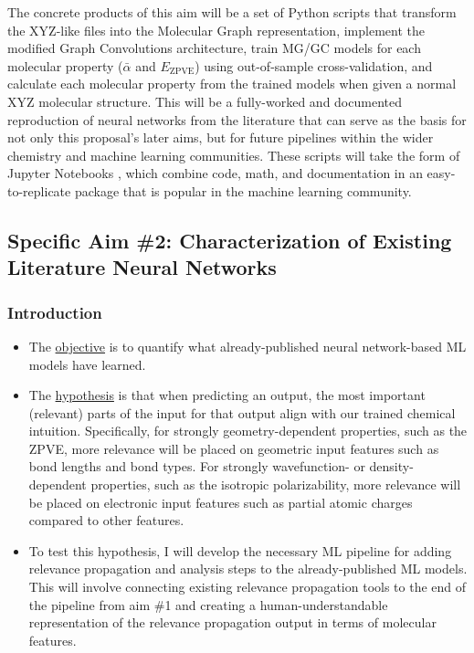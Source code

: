 \documentclass[12pt]{article}
\begin{document}
The concrete products of this aim will be a set of Python scripts that transform the XYZ-like files into the Molecular Graph representation, implement the modified Graph Convolutions architecture, train MG/GC models for each molecular property (\(\bar{\alpha}\) and \(E_\text{ZPVE}\)) using out-of-sample cross-validation, and calculate each molecular property from the trained models when given a normal XYZ molecular structure. This will be a fully-worked and documented reproduction of neural networks from the literature that can serve as the basis for not only this proposal's later aims, but for future pipelines within the wider chemistry and machine learning communities. These scripts will take the form of Jupyter Notebooks \cite{jupyter,PER-GRA:2007}, which combine code, math, and documentation in an easy-to-replicate package that is popular in the machine learning community.

\subsection{Specific Aim \#2: Characterization of Existing Literature Neural Networks}
\label{sec:orga2c3927}

\subsubsection{Introduction}
\label{sec:org1fda5da}

\begin{itemize}
\item The \uline{objective} is to quantify what already-published neural network-based ML models have learned.

\item The \uline{hypothesis} is that when predicting an output, the most important (relevant) parts of the input for that output align with our trained chemical intuition. Specifically, for strongly geometry-dependent properties, such as the ZPVE, more relevance will be placed on geometric input features such as bond lengths and bond types. For strongly wavefunction- or density-dependent properties, such as the isotropic polarizability, more relevance will be placed on electronic input features such as partial atomic charges compared to other features.

\item To test this hypothesis, I will develop the necessary ML pipeline for adding relevance propagation and analysis steps to the already-published ML models. This will involve connecting existing relevance propagation tools \cite{JMLR:v17:15-618,github:lrp,github:lrp_tf,github:lrp_tf2} to the end of the pipeline from aim \#1 and creating a human-understandable representation of the relevance propagation output in terms of molecular features.
\end{itemize}
\end{document}
